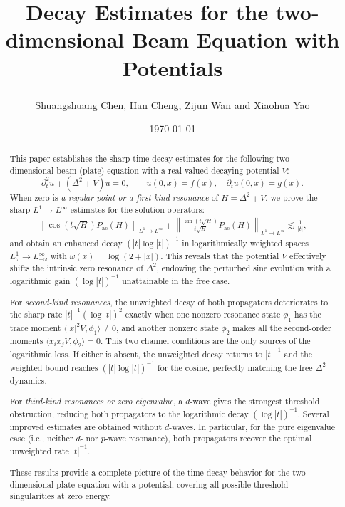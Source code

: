 \documentclass[reqno]{amsart}
\title[Decay estimates for Beam equations with potentials in dimension two]
{Decay Estimates for the two-dimensional Beam Equation with Potentials}
\author{Shuangshuang Chen, Han Cheng, Zijun Wan and Xiaohua Yao\textsuperscript{\dag}}
\date{\today}
\numberwithin{equation}{section}
\begin{document}
\begin{abstract}
 
This paper establishes the  sharp time-decay estimates for the following
two-dimensional beam  (plate)  equation with a real-valued
decaying potential $V$:
\[
\partial_t^2u+(\Delta^2+V)u=0,
\qquad
u(0,x)=f(x),\quad
\partial_tu(0,x)=g(x).
\]
When zero is \textit{a regular point or a first-kind resonance} of $H=\Delta^2+V$, we  prove the sharp $L^1\to L^\infty$ estimates for the solution operators:
	\begin{align*}
		\left\|\cos(t\sqrt{H})P_{\mathrm{ac}}(H)\right\|_{L^1\to L^\infty} +
		\left\|\frac{\sin(t\sqrt{H})}{t\sqrt{H}}P_{\mathrm{ac}}(H)\right\|_{L^1\to L^\infty} \lesssim \frac{1}{|t|},
	\end{align*}
	and obtain an enhanced decay $(|t|\log|t|)^{-1}$ in logarithmically weighted spaces $L^1_\omega\to L^\infty_{-\omega}$ with $\omega(x)=\log(2+|x|)$. This reveals that the potential $V$ effectively shifts the intrinsic zero resonance of  $\Delta^2$, endowing the  perturbed  sine evolution with a logarithmic gain $(\log|t|)^{-1}$ unattainable in the free case.
	
	
	
	For \textit{second-kind resonances}, 
    the unweighted decay of  both propagators deteriorates to the sharp rate
$
|t|^{-1}(\log|t|)^2
$
exactly when  one nonzero resonance
state $\phi_1$ has the trace moment
\(\langle |x|^2V,\phi_1\rangle\neq 0\), and another nonzero
state $\phi_2$ makes all the second-order moments
\(\langle x_ix_jV,\phi_2\rangle=0\). This two channel
conditions are the only sources of the logarithmic loss. If either
 is absent, the unweighted decay returns to 
\(|t|^{-1}\) and  the weighted bound reaches $(|t|\log|t|)^{-1}$ for the cosine, perfectly matching the free $\Delta^2$ dynamics.

	For \textit{third-kind resonances or zero eigenvalue}, a \(d\)-wave
 gives the strongest threshold obstruction, reducing  both propagators to the logarithmic decay
\((\log|t|)^{-1}\). Several improved estimates are  obtained  without $d$-waves. In particular, for the pure  eigenvalue case (i.e., neither $d$- nor $p$-wave resonance),  both propagators recover the optimal unweighted  rate $|t|^{-1}.$ 

	
	These results provide a complete picture of the time-decay behavior for the two-dimensional plate equation with a potential, covering all possible threshold singularities at zero energy.
\end{abstract}  
\end{document}
